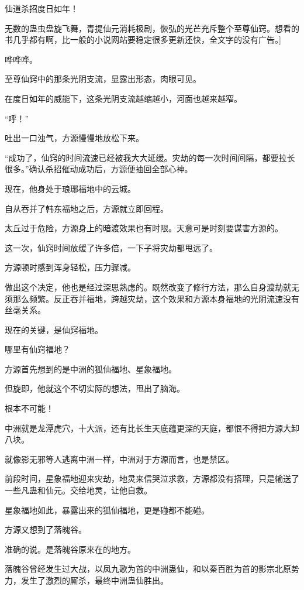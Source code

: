 
\begin{this_body}

仙道杀招度日如年！

无数的蛊虫盘旋飞舞，青提仙元消耗极剧，恢弘的光芒充斥整个至尊仙窍。想看的书几乎都有啊，比一般的小说网站要稳定很多更新还快，全文字的没有广告。]

哗哗哗。

至尊仙窍中的那条光阴支流，显露出形态，肉眼可见。

在度日如年的威能下，这条光阴支流越缩越小，河面也越来越窄。

“呼！”

吐出一口浊气，方源慢慢地放松下来。

“成功了，仙窍的时间流速已经被我大大延缓。灾劫的每一次时间间隔，都要拉长很多。”确认杀招催动成功后，方源便抽回全部心神。

现在，他身处于琅琊福地中的云城。

自从吞并了韩东福地之后，方源就立即回程。

太丘过于危险，方源身上的暗渡效果也有时限。天意可是时刻要谋害方源的。

这一次，仙窍时间放缓了许多倍，一下子将灾劫都甩远了。

方源顿时感到浑身轻松，压力骤减。

做出这个决定，他也是经过深思熟虑的。既然改变了修行方法，那么自身渡劫就无须那么频繁。反正吞并福地，跨越灾劫，这个效果和方源本身福地的光阴流速没有丝毫关系。

现在的关键，是仙窍福地。

哪里有仙窍福地？

方源首先想到的是中洲的狐仙福地、星象福地。

但旋即，他就这个不切实际的想法，甩出了脑海。

根本不可能！

中洲就是龙潭虎穴，十大派，还有比长生天底蕴更深的天庭，都恨不得把方源大卸八块。

就像影无邪等人逃离中洲一样，中洲对于方源而言，也是禁区。

前段时间，星象福地迎来灾劫，地灵来信哭泣求救，方源都没有搭理，只是输送了一些凡蛊和仙元。交给地灵，让他自救。

星象福地如此，暴露出来的狐仙福地，更是碰都不能碰。

方源又想到了落魄谷。

准确的说。是落魄谷原来在的地方。

落魄谷曾经发生过大战，以凤九歌为首的中洲蛊仙，和以秦百胜为首的影宗北原势力，发生了激烈的厮杀，最终中洲蛊仙胜出。


\end{this_body}
